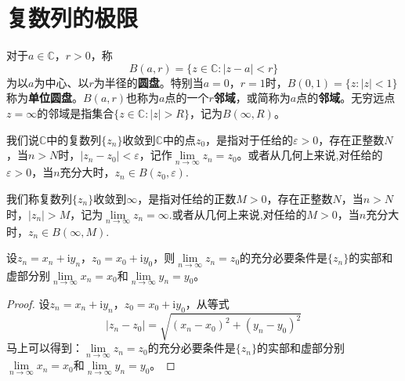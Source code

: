 \documentclass[../../main.tex]{subfiles}%
\begin{document}
\section{复数列的极限}

\begin{definition}
对于\(a \in \mathbb{C}\)，\(r > 0\)，称
\[
B(a, r) = \{ z \in \mathbb{C} : | z - a | < r \}
\]
为以\(a\)为中心、以\(r\)为半径的\textbf{圆盘}。特别当\(a = 0\)，\(r = 1\)时，\(B(0, 1) = \{ z : | z | < 1 \}\)称为\textbf{单位圆盘}。\(B(a, r)\)也称为\(a\)点的一个\textbf{\(r\)邻域}，或简称为\(a\)点的\textbf{邻域}。无穷远点\(z = \infty\)的邻域是指集合\(\{ z \in \mathbb{C} : | z | > R \}\)，记为\(B(\infty, R)\)。
\end{definition}

\begin{definition}
我们说\(\mathbb{C}\)中的复数列\(\{ z_n \}\)收敛到\(\mathbb{C}\)中的点\(z_0\)，是指对于任给的\(\varepsilon > 0\)，存在正整数\(N\)，当\(n > N\)时，\(| z_n - z_0 | < \varepsilon\)，记作\(\lim\limits_{n \to \infty} z_n = z_0\)。或者从几何上来说,对任给的\(\varepsilon > 0\)，当\(n\)充分大时，\(z_n \in B(z_0, \varepsilon)\).

我们称复数列\(\{ z_n \}\)收敛到\(\infty\)，是指对任给的正数\(M > 0\)，存在正整数\(N\)，当\(n > N\)时，\(| z_n | > M\)，记为\(\lim\limits_{n \to \infty} z_n = \infty\).或者从几何上来说,对任给的\(M > 0\)，当\(n\)充分大时，\(z_n \in B(\infty, M)\).
\end{definition}

\begin{theorem}\label{theorem:复数收敛的充要条件}
设\(z_n = x_n + \mathrm{i}y_n\)，\(z_0 = x_0 + \mathrm{i}y_0\)，则\(\lim\limits_{n \to \infty} z_n = z_0\)的充分必要条件是\(\{ z_n \}\)的实部和虚部分别\(\lim\limits_{n \to \infty} x_n = x_0\)和\(\lim\limits_{n \to \infty} y_n = y_0\)。
\end{theorem}
\begin{proof}

设\(z_n = x_n + \mathrm{i}y_n\)，\(z_0 = x_0 + \mathrm{i}y_0\)，从等式
\[
| z_n - z_0 | = \sqrt{(x_n - x_0)^2 + (y_n - y_0)^2}
\]
马上可以得到：\(\lim\limits_{n \to \infty} z_n = z_0\)的充分必要条件是\(\{ z_n \}\)的实部和虚部分别\(\lim\limits_{n \to \infty} x_n = x_0\)和\(\lim\limits_{n \to \infty} y_n = y_0\)。

\end{proof}
\end{document}
